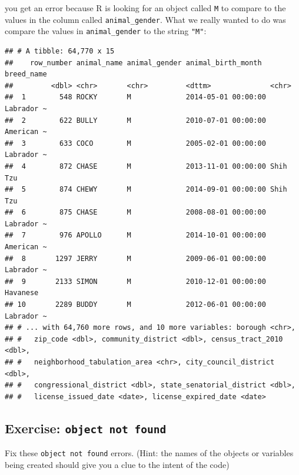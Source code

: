 \documentclass[]{Nemilov}
\newenvironment{Shaded}{\begin{snugshade}}{\end{snugshade}}
\newcommand{\KeywordTok}[1]{\textcolor[rgb]{0.13,0.29,0.53}{\textbf{#1}}}
\newcommand{\NormalTok}[1]{#1}
\newcommand{\OperatorTok}[1]{\textcolor[rgb]{0.81,0.36,0.00}{\textbf{#1}}}
\newcommand{\StringTok}[1]{\textcolor[rgb]{0.31,0.60,0.02}{#1}}
\begin{document}
you get an error because R is looking for an object called \texttt{M} to compare to the values in the column called \texttt{animal\_gender}. What we really wanted to do was compare the values in \texttt{animal\_gender} to the string \texttt{"M"}:

\begin{Shaded}
\end{Shaded}

\begin{verbatim}
## # A tibble: 64,770 x 15
##    row_number animal_name animal_gender animal_birth_month  breed_name
##         <dbl> <chr>       <chr>         <dttm>              <chr>     
##  1        548 ROCKY       M             2014-05-01 00:00:00 Labrador ~
##  2        622 BULLY       M             2010-07-01 00:00:00 American ~
##  3        633 COCO        M             2005-02-01 00:00:00 Labrador ~
##  4        872 CHASE       M             2013-11-01 00:00:00 Shih Tzu  
##  5        874 CHEWY       M             2014-09-01 00:00:00 Shih Tzu  
##  6        875 CHASE       M             2008-08-01 00:00:00 Labrador ~
##  7        976 APOLLO      M             2014-10-01 00:00:00 American ~
##  8       1297 JERRY       M             2009-06-01 00:00:00 Labrador ~
##  9       2133 SIMON       M             2010-12-01 00:00:00 Havanese  
## 10       2289 BUDDY       M             2012-06-01 00:00:00 Labrador ~
## # ... with 64,760 more rows, and 10 more variables: borough <chr>,
## #   zip_code <dbl>, community_district <dbl>, census_tract_2010 <dbl>,
## #   neighborhood_tabulation_area <chr>, city_council_district <dbl>,
## #   congressional_district <dbl>, state_senatorial_district <dbl>,
## #   license_issued_date <date>, license_expired_date <date>
\end{verbatim}

\hypertarget{exercise-object-not-found}{%
\subsection{\texorpdfstring{Exercise: \texttt{object\ not\ found}}{Exercise: object not found}}\label{exercise-object-not-found}}

Fix these \texttt{object\ not\ found} errors. (Hint: the names of the objects or variables being created should give you a clue to the intent of the code)
\end{document}
